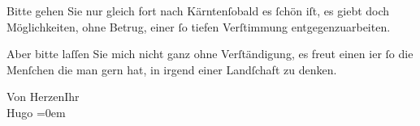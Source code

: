 \pstart
           Bitte gehen Sie nur gleich fort nach Kärntenſobald es{ }ſchön iſt, es giebt doch Möglichkeiten,
               ohne Betrug, einer{ }ſo tiefen Verſtimmung entgegenzuarbeiten.\pend
           
\pstart
           {\pb}Aber bitte laſſen Sie mich nicht
               ganz ohne Verſtändigung, es freut einen i{\geminationm}er{ }ſo die
               Menſchen die man gern hat, in irgend einer Landſchaft zu denken.\pend
           
\pstart
           Von Herzen\hspace*{2em}Ihr{\\[\baselineskip]}\spacefill\mbox{Hugo}\pend
           \leftskip=0em{}\endnumbering{}  \newcommand{\dateiname}{L00800}\newcommand{\titel}{Hugo von Hofmannsthal an Arthur Schnitzler, [3.? 6. 1898]}\newcommand{\editorInnen}{Martin Anton Müller und Gerd-Hermann Susen}
